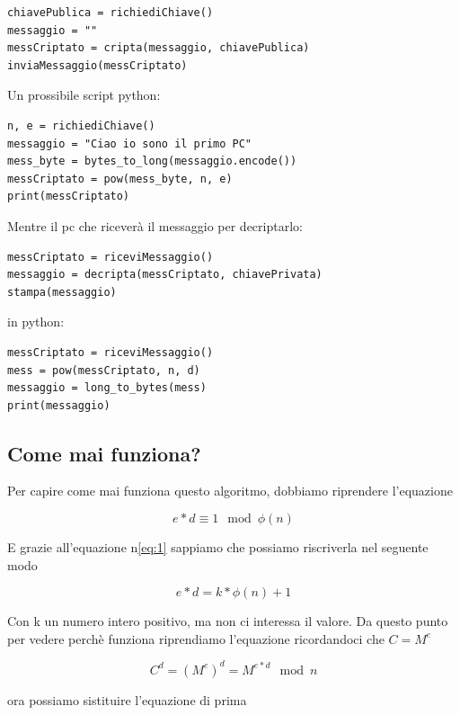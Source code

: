 \documentclass{rapport}
\begin{document}
\begin{lstlisting}[language=CustomPython]
chiavePublica = richiediChiave()  
messaggio = ""
messCriptato = cripta(messaggio, chiavePublica)
inviaMessaggio(messCriptato)
\end{lstlisting}

Un prossibile script python:

\begin{lstlisting}[language=CustomPython]
n, e = richiediChiave()
messaggio = "Ciao io sono il primo PC"
mess_byte = bytes_to_long(messaggio.encode())
messCriptato = pow(mess_byte, n, e)
print(messCriptato)
\end{lstlisting}

Mentre il pc che riceverà il messaggio per decriptarlo:
\begin{lstlisting}[language=CustomPython]
messCriptato = riceviMessaggio()  
messaggio = decripta(messCriptato, chiavePrivata)
stampa(messaggio)
\end{lstlisting}

in python:
\begin{lstlisting}[language=CustomPython]
messCriptato = riceviMessaggio()
mess = pow(messCriptato, n, d)    
messaggio = long_to_bytes(mess)
print(messaggio)
\end{lstlisting}

\newpage
\subsection{Come mai funziona?}
Per capire come mai funziona questo algoritmo, dobbiamo riprendere l'equazione

\begin{equation*}
    e * d \equiv 1 \mod \phi(n)
\end{equation*}

E grazie all'equazione n\ref{eq:1} sappiamo che possiamo riscriverla nel seguente modo


\begin{equation*}
    e * d = k*\phi(n) + 1 
\end{equation*}


Con k un numero intero positivo, ma non ci interessa il valore. Da questo punto per vedere perchè funziona riprendiamo l'equazione ricordandoci che $C = M^e$


\begin{equation*}
    C^d = (M^e)^d = M^{e*d} \mod n
\end{equation*}

ora possiamo sistituire l'equazione di prima
\end{document}
